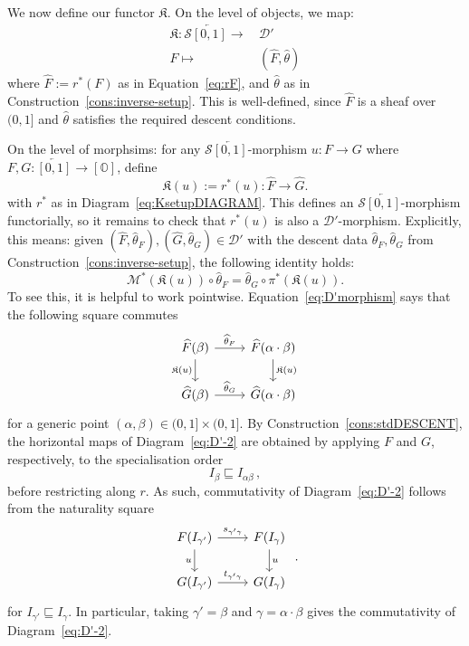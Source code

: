 \documentclass[a4paper, 11pt,reqno]{amsart}
\newcommand{\M}{\mathcal{M}}
\newcommand{\baseS}{\mathcal{S}}
\newcommand{\D}{\mathcal{D}}
\newcommand{\K}{\mathfrak{K}}
\begin{document}
We now define our functor $\K$. On the level of objects, we map:
\begin{align*}
\mathfrak{K}\colon \mathcal{S}\overleftarrow{[0,1]} \longrightarrow & \,\mathcal{D}'\\
F \longmapsto & \,(\widehat{F},\widehat{\theta})
\end{align*}
where $\widehat{F}:=r^\ast(F)$ as in Equation~\eqref{eq:rF}, and $\widehat{\theta}$ as in Construction~\ref{cons:inverse-setup}. This is well-defined, since $\widehat{F}$ is a sheaf over $(0,1]$ and $\widehat{\theta}$ satisfies the required descent conditions.

On the level of morphsims: for any $\baseS\overleftarrow{[0,1]}$-morphism $u\colon F\rightarrow G$ where $F,G\colon\overleftarrow{[0,1]}\rightarrow [\mathbb{O}]$, define 
\[\K(u):= r^*(u)\colon \widehat{F}\rightarrow\widehat{G}.\]
with $r^\ast$ as in Diagram~\eqref{eq:KsetupDIAGRAM}. This defines an $\baseS\overleftarrow{[0,1]}$-morphism functorially, so it remains to check that $r^\ast (u)$ is also a $\D'$-morphism. Explicitly, this means: given $(\widehat{F},\widehat{\theta}_F), (\widehat{G},\widehat{\theta}_G)\in \mathcal{D}'$ with the descent data $\widehat{\theta}_F,\widehat{\theta}_G$ from Construction~\ref{cons:inverse-setup}, the following identity holds:
\begin{equation}\label{eq:D'morphism}
\M^*(\K(u))\circ \widehat{\theta}_F =\widehat{\theta}_{G}\circ \pi^*(\mathfrak{K}(u)).
\end{equation}
To see this, it is helpful to work pointwise. Equation~\eqref{eq:D'morphism} says that the following square commutes
\begin{equation}\label{eq:D'-2}
\begin{tikzcd}
\widehat{F}(\beta) \ar[r,"\widehat{\theta}_F"] \ar[d,swap, "\mathfrak{K}(u)"] & \widehat{F}(\alpha\cdot \beta) \ar[d, "\mathfrak{K}(u)"] \\
\widehat{G}(\beta) \ar[r,"\widehat{\theta}_G"] & \widehat{G}(\alpha\cdot \beta)
\end{tikzcd}
\end{equation}
for a generic point $(\alpha,\beta)\in (0,1]\times (0,1]$. By Construction~\ref{cons:stdDESCENT}, the horizontal maps of Diagram~\eqref{eq:D'-2} are obtained by applying $F$ and $G$, respectively, to the specialisation order
$$I_\beta\sqsubseteq I_{\alpha\beta}\,,$$
before restricting along $r$. As such, commutativity of Diagram~\eqref{eq:D'-2} follows from the naturality square \[\begin{tikzcd} F(I_{\gamma'}) \ar[r,"s_{\gamma'\gamma}"] \ar[d,swap, "u"] & F(I_\gamma) \ar[d, "u"] \\ G(I_{\gamma'}) \ar[r,"t_{\gamma'\gamma}"] & G(I_\gamma) \end{tikzcd}\,\,.\]
for $I_{\gamma'}\sqsubseteq I_\gamma$. In particular, taking $\gamma'=\beta$ and $\gamma=\alpha\cdot \beta$ gives the commutativity of Diagram~\eqref{eq:D'-2}.
\end{document}
